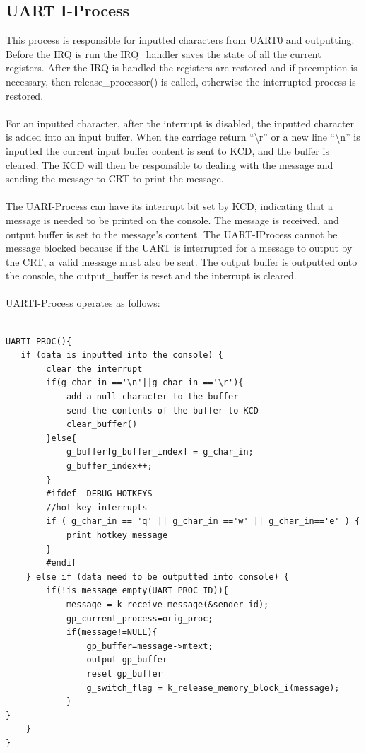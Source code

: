 \documentclass[12pt]{article}
\begin{document}
\subsection{UART I-Process}
This process is responsible for inputted characters from UART0 and outputting. Before the IRQ is run the IRQ\_handler saves the state of all the current registers. After the IRQ is handled the registers are restored and if preemption is necessary, then release\_processor() is called, otherwise the interrupted process is restored.   \\ \\
For an inputted character, after the interrupt is disabled, the inputted character is added into an input buffer. When the carriage return “\textbackslash r” or a new line “\textbackslash n” is inputted the current input buffer content is sent to KCD, and the buffer is cleared. The KCD will then be responsible to dealing with the message and sending the message to CRT to print the message. \\ \\
The UARI-Process can have its interrupt bit set by KCD, indicating that a message is needed to be printed on the console. The message is received, and output buffer is set to the message’s content. The UART-IProcess cannot be message blocked because if the UART is interrupted for a message to output by the CRT, a valid message must also be sent. The output buffer is outputted onto the console, the output\_buffer is reset and the interrupt is cleared. \\ \\
UARTI-Process operates as follows: \\ \\
\begin{verbatim}
UARTI_PROC(){
   if (data is inputted into the console) { 
		clear the interrupt
		if(g_char_in =='\n'||g_char_in =='\r'){
			add a null character to the buffer
			send the contents of the buffer to KCD
			clear_buffer()
		}else{
			g_buffer[g_buffer_index] = g_char_in;
			g_buffer_index++;
		}	
		#ifdef _DEBUG_HOTKEYS
		//hot key interrupts
		if ( g_char_in == 'q' || g_char_in =='w' || g_char_in=='e' ) {
			print hotkey message
		}
		#endif
	} else if (data need to be outputted into console) {
		if(!is_message_empty(UART_PROC_ID)){
			message = k_receive_message(&sender_id);
			gp_current_process=orig_proc;
			if(message!=NULL){
				gp_buffer=message->mtext;
				output gp_buffer
				reset gp_buffer
				g_switch_flag = k_release_memory_block_i(message);
			} 
}
	}
}
\end{verbatim}
\end{document}
